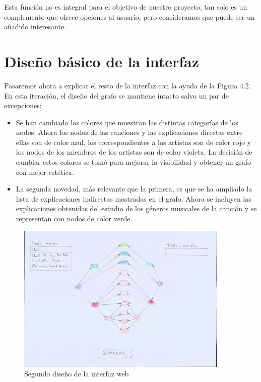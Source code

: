 Esta función no es integral para el objetivo de nuestro proyecto, tan solo es un complemento que ofrece opciones al usuario, pero consideramos que puede ser un añadido interesante.\\

\section{Diseño básico de la interfaz}

Pasaremos ahora a explicar el resto de la interfaz con la ayuda de la Figura 4.2. En esta iteración, el diseño del grafo se mantiene intacto salvo un par de excepciones:

\begin{itemize}
\item Se han cambiado los colores que muestran las distintas categorías de los nodos. Ahora los nodos de las canciones y las explicaciones directas entre ellas son de color azul, los correspondientes a los artistas son de color rojo y los nodos de los miembros de los artistas son de color violeta. La decisión de cambiar estos colores se tomó para mejorar la visibilidad y obtener un grafo con mejor estética.\\

\item La segunda novedad, más relevante que la primera, es que se ha ampliado la lista de explicaciones indirectas mostradas en el grafo. Ahora se incluyen las explicaciones obtenidas del estudio de los géneros musicales de la canción y se representan con nodos de color verde.\\
\end{itemize}


\begin{figure}[h!]
	\centering
	\includegraphics[width = 0.9\textwidth]{Imagenes/Bitmap/Segunda Interfaz.jpg}
	\caption{Segundo diseño de la interfaz web}
	\label{fig:sampleImage}
\end{figure}

